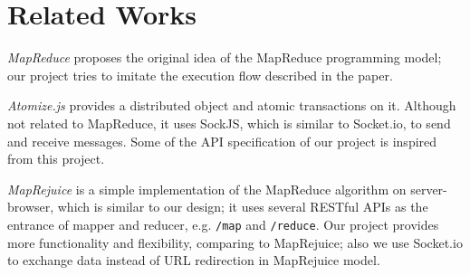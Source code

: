 \section{Related Works}

\emph{MapReduce}\cite{mapreduce} proposes the original idea of the MapReduce programming model; our project tries to imitate the execution flow described in the paper.

\emph{Atomize.js}\cite{atomizejs} provides a distributed object and atomic transactions on it.
Although not related to MapReduce, it uses SockJS\cite{sockjs}, which is similar to Socket.io, to send and receive messages.
Some of the API specification of our project is inspired from this project.

\emph{MapRejuice}\cite{maprejuice} is a simple implementation of the MapReduce algorithm on server-browser, which is similar to our design; it uses several RESTful APIs as the entrance of mapper and reducer, e.g. \texttt{/map} and \texttt{/reduce}.
Our project provides more functionality and flexibility, comparing to MapRejuice; also we use Socket.io to exchange data instead of URL redirection in MapRejuice model.

